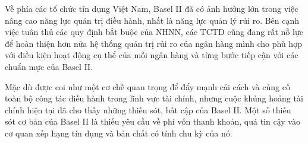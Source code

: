 Về phía các tổ chức tín dụng Việt Nam, Basel II đã có ảnh hưởng lớn trong việc nâng cao năng lực quản trị điều hành, nhất là năng lực quản lý rủi ro. Bên cạnh việc tuân thủ các quy định bắt buộc của NHNN, các TCTD cũng đang rất nỗ lực để hoàn thiện hơn nữa hệ thống quản trị rủi ro của ngân hàng mình cho phù hợp với điều kiện hoạt động cụ thể của mỗi ngân hàng và từng bước tiếp cận với các chuẩn mực của Basel II.

Mặc dù được coi như một cơ chế quan trọng để đẩy mạnh cải cách và củng cố toàn bộ công tác điều hành trong lĩnh vực tài chính, nhưng cuộc khủng hoảng tài chính hiện tại đã cho thấy những thiếu sót, bất cập của Basel II. Một số thiếu sót cơ bản của Basel II là thiếu yêu cầu về phí vốn thanh khoản, quá tin cậy vào cơ quan xếp hạng tín dụng và bản chất có tính chu kỳ của nó.
